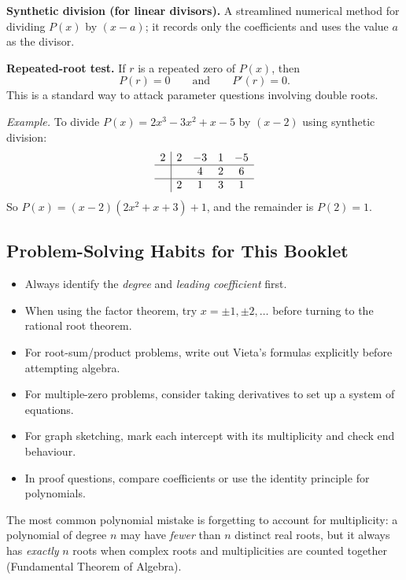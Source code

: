 \documentclass[12pt]{article}
\newenvironment{remark}[1][]{%
  \begin{remarkbox}[title={\bfseries Remark~\thetcbcounter\ifx\relax#1\relax\else\ (#1)\fi}]%
}{%
  \end{remarkbox}%
}
\begin{document}
\textbf{Synthetic division (for linear divisors).} A streamlined numerical method for dividing $P(x)$ by $(x - a)$; it records only the coefficients and uses the value $a$ as the divisor.

\textbf{Repeated-root test.} If $r$ is a repeated zero of $P(x)$, then
\[
P(r)=0\qquad\text{and}\qquad P'(r)=0.
\]
This is a standard way to attack parameter questions involving double roots.

\textit{Example.} To divide $P(x) = 2x^3 - 3x^2 + x - 5$ by $(x - 2)$ using synthetic division:
\[
\begin{array}{c|cccc}
  2 & 2 & -3 & 1 & -5 \\\hline
    &   & 4  & 2 & 6 \\\hline
    & 2 & 1  & 3 & 1
\end{array}
\]
So $P(x) = (x-2)(2x^2 + x + 3) + 1$, and the remainder is $P(2) = 1$. \checkmark

\subsection{Problem-Solving Habits for This Booklet}
\begin{itemize}[leftmargin=*]
  \item Always identify the \emph{degree} and \emph{leading coefficient} first.
  \item When using the factor theorem, try $x = \pm 1, \pm 2, \ldots$ before turning to the rational root theorem.
  \item For root-sum/product problems, write out Vieta's formulas explicitly before attempting algebra.
  \item For multiple-zero problems, consider taking derivatives to set up a system of equations.
  \item For graph sketching, mark each intercept with its multiplicity and check end behaviour.
  \item In proof questions, compare coefficients or use the identity principle for polynomials.
\end{itemize}

\begin{remark}
The most common polynomial mistake is forgetting to account for multiplicity: a polynomial of degree $n$ may have \emph{fewer} than $n$ distinct real roots, but it always has \emph{exactly} $n$ roots when complex roots and multiplicities are counted together (Fundamental Theorem of Algebra).
\end{remark}
\end{document}
